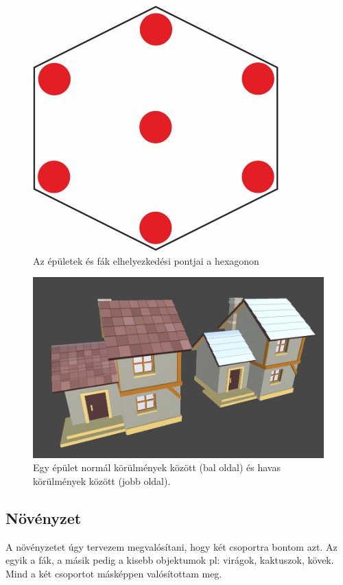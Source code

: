 \begin{figure}[h!]
\centering
\includegraphics[scale=1]{kepek/Places.jpg}
\caption{Az épületek és fák elhelyezkedési pontjai a hexagonon}
\label{fig:Places}
\end{figure}

\begin{figure}[h!]
\centering
\includegraphics[scale=0.3]{kepek/Buildings.JPG}
\caption{Egy épület normál körülmények között (bal oldal) és havas körülmények között (jobb oldal).}
\label{fig:Buildings}
\end{figure}

\subsection{Növényzet}

A növényzetet úgy tervezem megvalósítani, hogy két csoportra bontom azt. Az egyik a fák, a másik pedig a kisebb objektumok pl: virágok, kaktuszok, kövek.  Mind a két csoportot másképpen valósítottam meg.

